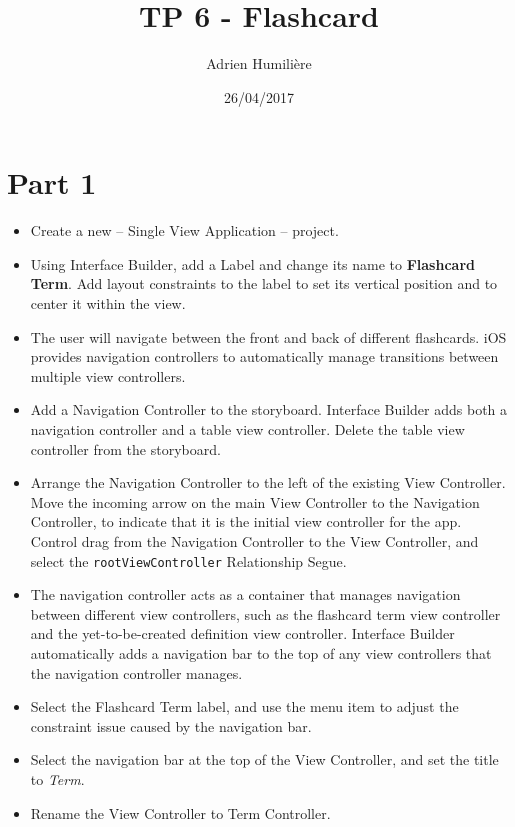 \documentclass[a4paper,11pt]{scrartcl}
\begin{document}
\newcommand{\mytitle}{TP 6 - Flashcard}
\title{\mytitle}
\author{Adrien Humilière}
\date{26/04/2017}

\maketitle

\section*{Part 1}

\begin{itemize}
\item Create a new – Single View Application – project.
\item Using Interface Builder, add a Label and change its name to \textbf{Flashcard Term}. Add layout constraints to the label to set its vertical position and to center it within the view.
\item The user will navigate between the front and back of different flashcards. iOS provides navigation controllers to automatically manage transitions between multiple view controllers.
\item Add a Navigation Controller to the storyboard. Interface Builder adds both a navigation controller and a table view controller. Delete the table view controller from the storyboard.
\item Arrange the Navigation Controller to the left of the existing View Controller. Move the incoming arrow on the main View Controller to the Navigation Controller, to indicate that it is the initial view controller for the app. Control drag from the Navigation Controller to the View Controller, and select the \texttt{rootViewController} Relationship Segue.
\item The navigation controller acts as a container that manages navigation between different view controllers, such as the flashcard term view controller and the yet-to-be-created definition view controller. Interface Builder automatically adds a navigation bar to the top of any view controllers that the navigation controller manages.
\item Select the Flashcard Term label, and use the  menu item to adjust the constraint issue caused by the navigation bar.
\item Select the navigation bar at the top of the View Controller, and set the title to \textit{Term}.
\item Rename the View Controller to Term Controller.

\end{itemize}
\end{document}

